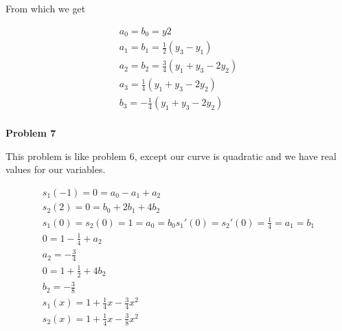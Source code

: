 \documentclass[a4paper,12pt]{article}
\begin{document}
From which we get

\begin{eqnarray*}
a_0=b_0=y2 \\
a_1=b_1=\frac{1}{2}(y_3-y_1) \\
a_2=b_2=\frac{3}{4}(y_1+y_3-2y_2) \\
a_3=\frac{1}{4}(y_1+y_3-2y_2) \\
b_3=-\frac{1}{4}(y_1+y_3-2y_2) \\
\end{eqnarray*}

{\bf Problem 7}

This problem is like problem 6, except our curve is quadratic and we have real values for our variables. 

\begin{eqnarray*}
s_1(-1)=0=a_0-a_1+a_2 \\
s_2(2)=0=b_0+2b_1+4b_2 \\
s_1(0)=s_2(0)=1=a_0=b_0
s_1'(0)=s_2'(0)=\frac{1}{4}=a_1=b_1 \\
0=1-\frac{1}{4}+a_2 \\
a_2=-\frac{3}{4} \\
0 = 1+\frac{1}{2}+4b_2 \\
b_2=-\frac{3}{8} \\ 
s_1(x)=1+\frac{1}{4}x-\frac{3}{4}x^2 \\
s_2(x)=1+\frac{1}{4}x-\frac{3}{8}x^2 
\end{eqnarray*}
\end{document}
